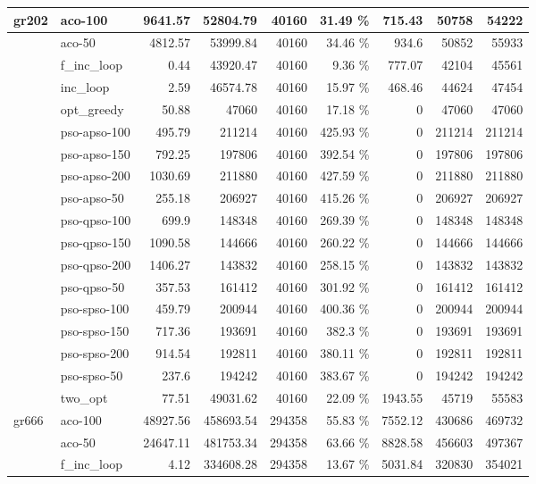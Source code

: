 \documentclass[conference]{IEEEtran}
\begin{document}
\begin{center}
\begin{longtable}[ht]{|l|l|r|r|r|r|r|r|r|}
gr202 & aco-100 & 9641.57 & 52804.79 & 40160 & 31.49 \% & 715.43 & 50758 & 54222 \\ \hline
 & aco-50 & 4812.57 & 53999.84 & 40160 & 34.46 \% & 934.6 & 50852 & 55933 \\ \hline
 & f\_inc\_loop & 0.44 & 43920.47 & 40160 & 9.36 \% & 777.07 & 42104 & 45561 \\ \hline
 & inc\_loop & 2.59 & 46574.78 & 40160 & 15.97 \% & 468.46 & 44624 & 47454 \\ \hline
 & opt\_greedy & 50.88 & 47060 & 40160 & 17.18 \% & 0 & 47060 & 47060 \\ \hline
 & pso-apso-100 & 495.79 & 211214 & 40160 & 425.93 \% & 0 & 211214 & 211214 \\ \hline
 & pso-apso-150 & 792.25 & 197806 & 40160 & 392.54 \% & 0 & 197806 & 197806 \\ \hline
 & pso-apso-200 & 1030.69 & 211880 & 40160 & 427.59 \% & 0 & 211880 & 211880 \\ \hline
 & pso-apso-50 & 255.18 & 206927 & 40160 & 415.26 \% & 0 & 206927 & 206927 \\ \hline
 & pso-qpso-100 & 699.9 & 148348 & 40160 & 269.39 \% & 0 & 148348 & 148348 \\ \hline
 & pso-qpso-150 & 1090.58 & 144666 & 40160 & 260.22 \% & 0 & 144666 & 144666 \\ \hline
 & pso-qpso-200 & 1406.27 & 143832 & 40160 & 258.15 \% & 0 & 143832 & 143832 \\ \hline
 & pso-qpso-50 & 357.53 & 161412 & 40160 & 301.92 \% & 0 & 161412 & 161412 \\ \hline
 & pso-spso-100 & 459.79 & 200944 & 40160 & 400.36 \% & 0 & 200944 & 200944 \\ \hline
 & pso-spso-150 & 717.36 & 193691 & 40160 & 382.3 \% & 0 & 193691 & 193691 \\ \hline
 & pso-spso-200 & 914.54 & 192811 & 40160 & 380.11 \% & 0 & 192811 & 192811 \\ \hline
 & pso-spso-50 & 237.6 & 194242 & 40160 & 383.67 \% & 0 & 194242 & 194242 \\ \hline
 & two\_opt & 77.51 & 49031.62 & 40160 & 22.09 \% & 1943.55 & 45719 & 55583 \\ \hline
gr666 & aco-100 & 48927.56 & 458693.54 & 294358 & 55.83 \% & 7552.12 & 430686 & 469732 \\ \hline
 & aco-50 & 24647.11 & 481753.34 & 294358 & 63.66 \% & 8828.58 & 456603 & 497367 \\ \hline
 & f\_inc\_loop & 4.12 & 334608.28 & 294358 & 13.67 \% & 5031.84 & 320830 & 354021 \\ \hline

\end{longtable}
\end{center}
\end{document}
